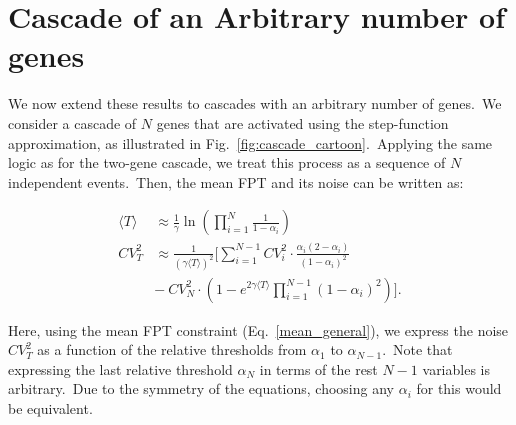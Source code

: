 \documentclass[aps,prb,reprint,superscriptaddress]{revtex4-2}
\begin{document}



\section{Cascade of an Arbitrary number  of genes}\label{section5}
We now extend these results to cascades with an arbitrary number of genes.~We consider a cascade of $N$ genes that are activated using the step-function approximation, as illustrated in Fig.~\ref{fig:cascade_cartoon}.~Applying the same logic as for the two-gene cascade, we treat this process as a sequence of $N$ independent events.~Then, the mean FPT and its noise can be written as:

\begin{subequations}
\begin{align}
\label{mean_general}
\langle T \rangle &\approx \frac{1}{\gamma}\ln{\left(\prod_{i=1}^{N}\frac{1}{1-\alpha_i}\right)}\\
CV^2_T &\approx\frac{1}{\left(\gamma\langle T\rangle\right)^2}\Bigg[\sum_{i=1}^{N-1}CV^2_{i}\cdot\frac{\alpha_{i}\left(2 - \alpha_{i}\right)}{\left(1-\alpha_{i}\right)^2} \nonumber\\&- \:CV^2_{N}\cdot \left(1-e^{2\gamma\langle T \rangle} \prod_{i=1}^{N-1}(1-\alpha_{i})^2\right)\Bigg].\label{noise_general}
\end{align}
\end{subequations}

Here, using the mean FPT constraint (Eq.~\eqref{mean_general}), we express the noise $CV^2_T$ as a function of the relative thresholds from $\alpha_{1}$ to $\alpha_{{N-1}}$.~Note that expressing the last relative threshold $\alpha_{N}$ in terms of the rest $N-1$ variables is arbitrary.~Due to the symmetry of the equations, choosing any $\alpha_{i}$ for this would be equivalent.
\end{document}
